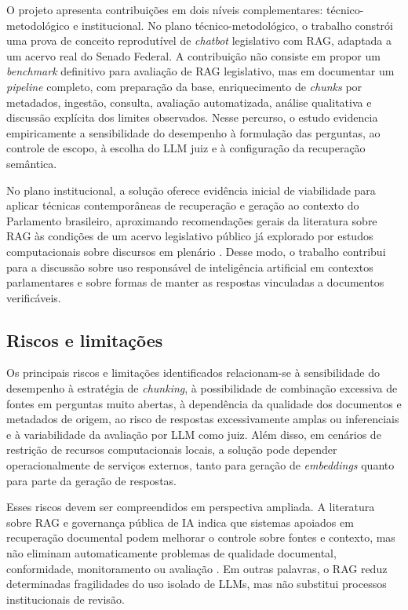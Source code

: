 O projeto apresenta contribuições em dois níveis complementares: técnico-metodológico e institucional. No plano técnico-metodológico, o trabalho constrói uma prova de conceito reprodutível de \textit{chatbot} legislativo com RAG, adaptada a um acervo real do Senado Federal. A contribuição não consiste em propor um \textit{benchmark} definitivo para avaliação de RAG legislativo, mas em documentar um \textit{pipeline} completo, com preparação da base, enriquecimento de \textit{chunks} por metadados, ingestão, consulta, avaliação automatizada, análise qualitativa e discussão explícita dos limites observados. Nesse percurso, o estudo evidencia empiricamente a sensibilidade do desempenho à formulação das perguntas, ao controle de escopo, à escolha do LLM juiz e à configuração da recuperação semântica.

No plano institucional, a solução oferece evidência inicial de viabilidade para aplicar técnicas contemporâneas de recuperação e geração ao contexto do Parlamento brasileiro, aproximando recomendações gerais da literatura sobre RAG às condições de um acervo legislativo público já explorado por estudos computacionais sobre discursos em plenário \parencite{blanco2025plenarioPalanqueEstudio,blanco2026letrasGraudas}. Desse modo, o trabalho contribui para a discussão sobre uso responsável de inteligência artificial em contextos parlamentares e sobre formas de manter as respostas vinculadas a documentos verificáveis.

\subsection{Riscos e limitações}

Os principais riscos e limitações identificados relacionam-se à sensibilidade do desempenho à estratégia de \textit{chunking}, à possibilidade de combinação excessiva de fontes em perguntas muito abertas, à dependência da qualidade dos documentos e metadados de origem, ao risco de respostas excessivamente amplas ou inferenciais e à variabilidade da avaliação por LLM como juiz. Além disso, em cenários de restrição de recursos computacionais locais, a solução pode depender operacionalmente de serviços externos, tanto para geração de \textit{embeddings} quanto para parte da geração de respostas.

Esses riscos devem ser compreendidos em perspectiva ampliada. A literatura sobre RAG e governança pública de IA indica que sistemas apoiados em recuperação documental podem melhorar o controle sobre fontes e contexto, mas não eliminam automaticamente problemas de qualidade documental, conformidade, monitoramento ou avaliação \parencite{gao2023ragSurvey,deAlmeidaSantos2025aiGovernance,saadFalconEtAl2024ares}. Em outras palavras, o RAG reduz determinadas fragilidades do uso isolado de LLMs, mas não substitui processos institucionais de revisão.
